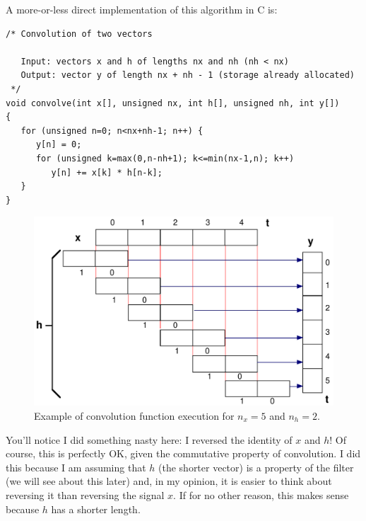 A more-or-less direct implementation of this algorithm in C is:

\begin{small}
\begin{verbatim}
/* Convolution of two vectors

   Input: vectors x and h of lengths nx and nh (nh < nx)
   Output: vector y of length nx + nh - 1 (storage already allocated)
 */
void convolve(int x[], unsigned nx, int h[], unsigned nh, int y[])
{
   for (unsigned n=0; n<nx+nh-1; n++) {
      y[n] = 0;
      for (unsigned k=max(0,n-nh+1); k<=min(nx-1,n); k++)
         y[n] += x[k] * h[n-k];
   }
}
\end{verbatim}
\end{small}

\begin{figure}
\centerline{\includegraphics[width=\textwidth]{ch-conv/fig6-5}}
\caption{Example of convolution function execution for $n_x=5$ and
$n_h=2$.\label{fg:convex}}
\end{figure}

You'll notice I did something nasty here: I reversed the identity of
$x$ and $h$! Of course, this is perfectly OK, given the commutative
property of convolution. I did this because I am assuming that $h$
(the shorter vector) is a property of the filter (we will see about
this later) and, in my opinion, it is easier to think about reversing
it than reversing the signal $x$. If for no other reason, this makes
sense because $h$ has a shorter length.

